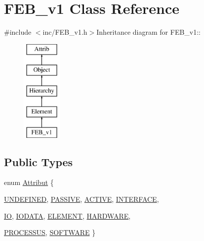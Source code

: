 \hypertarget{classFEB__v1}{
\section{FEB\_\-v1 Class Reference}
\label{classFEB__v1}
}


{\ttfamily \#include $<$inc/FEB\_\-v1.h$>$}Inheritance diagram for FEB\_\-v1::\begin{figure}[H]
\begin{center}
\leavevmode
\includegraphics[height=5cm]{classFEB__v1}
\end{center}
\end{figure}
\subsection*{Public Types}
\begin{DoxyCompactItemize}
\item 
enum \hyperlink{classAttrib_a69e171d7cc6417835a5a306d3c764235}{Attribut} \{ \par
\hyperlink{classAttrib_a69e171d7cc6417835a5a306d3c764235a3a8da2ab97dda18aebab196fe4100531}{UNDEFINED}, 
\hyperlink{classAttrib_a69e171d7cc6417835a5a306d3c764235a2bfb2af57b87031d190a05fe25dd92ed}{PASSIVE}, 
\hyperlink{classAttrib_a69e171d7cc6417835a5a306d3c764235a3b1fec929c0370d1436f2f06e298fb0d}{ACTIVE}, 
\hyperlink{classAttrib_a69e171d7cc6417835a5a306d3c764235aa27c16b480a369ea4d18b07b2516bbc7}{INTERFACE}, 
\par
\hyperlink{classAttrib_a69e171d7cc6417835a5a306d3c764235a1420a5b8c0540b2af210b6975eded7f9}{IO}, 
\hyperlink{classAttrib_a69e171d7cc6417835a5a306d3c764235a0af3b0d0ac323c1704e6c69cf90add28}{IODATA}, 
\hyperlink{classAttrib_a69e171d7cc6417835a5a306d3c764235a7788bc5dd333fd8ce18562b269c9dab1}{ELEMENT}, 
\hyperlink{classAttrib_a69e171d7cc6417835a5a306d3c764235a61ceb22149f365f1780d18f9d1459423}{HARDWARE}, 
\par
\hyperlink{classAttrib_a69e171d7cc6417835a5a306d3c764235a75250e29692496e73effca2c0330977f}{PROCESSUS}, 
\hyperlink{classAttrib_a69e171d7cc6417835a5a306d3c764235a103a67cd0b8f07ef478fa45d4356e27b}{SOFTWARE}
 \}
\end{DoxyCompactItemize}
